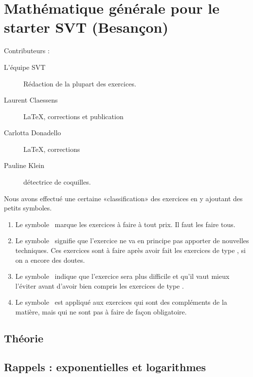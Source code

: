 
\chapter{Mathématique générale pour le starter SVT (Besançon)}

Contributeurs :
\begin{description}
    \item[L'équipe SVT] Rédaction de la plupart des exercices.
    \item[Laurent Claessens] \LaTeX, corrections et publication
    \item[Carlotta Donadello] \LaTeX, corrections
    \item[Pauline Klein] détectrice de coquilles.
\end{description}

Nous avons effectué une certaine «classification» des exercices en y ajoutant des petits symboles.
\begin{enumerate}
	\item Le symbole \minsyndical\ marque les exercices à faire à tout prix. Il faut les faire tous.
	\item Le symbole \boringexo\ signifie que l'exercice ne va en principe pas apporter de nouvelles techniques. Ces exercices sont à faire après avoir fait les exercices de type \minsyndical, si on a encore des doutes.
	\item Le symbole \coolexo\ indique que l'exercice sera plus difficile et qu'il vaut mieux l'éviter avant d'avoir bien compris les exercices de type \minsyndical.
	\item Le symbole \mortelexo\ est appliqué aux exercices qui sont des compléments de la matière, mais qui ne sont pas à faire de façon obligatoire.
\end{enumerate}

\section{Théorie}


\section{Rappels : exponentielles et logarithmes}


